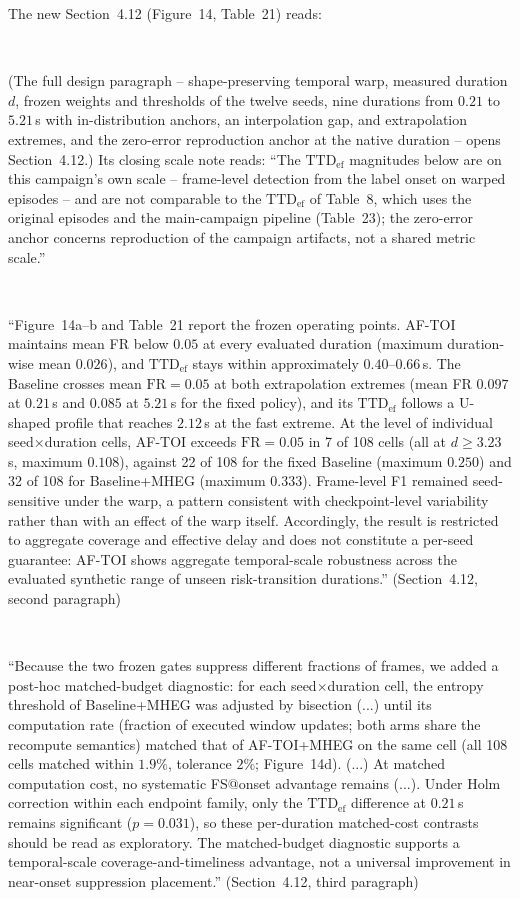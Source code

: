 \documentclass[1p,12pt,authoryear]{elsarticle}
\begin{document}
\vspace{2mm}
\noindent The new Section~4.12 (Figure~14, Table~21) reads:

~

(The full design paragraph -- shape-preserving temporal warp, measured duration $d$, frozen weights and thresholds of the twelve seeds, nine durations from $0.21$ to $5.21$\,s with in-distribution anchors, an interpolation gap, and extrapolation extremes, and the zero-error reproduction anchor at the native duration -- opens Section~4.12.) Its closing scale note reads: ``The $\mathrm{TTD}_{\mathrm{ef}}$ magnitudes below are on this campaign's own scale -- frame-level detection from the label onset on warped episodes -- and are not comparable to the $\mathrm{TTD}_{\mathrm{ef}}$ of Table~8, which uses the original episodes and the main-campaign pipeline (Table~23); the zero-error anchor concerns reproduction of the campaign artifacts, not a shared metric scale.''

~

``Figure~14a--b and Table~21 report the frozen operating points. AF-TOI maintains mean FR below $0.05$ at every evaluated duration (maximum duration-wise mean $0.026$), and $\mathrm{TTD}_{\mathrm{ef}}$ stays within approximately $0.40$--$0.66$\,s. The Baseline crosses mean $\mathrm{FR}=0.05$ at both extrapolation extremes (mean FR $0.097$ at $0.21$\,s and $0.085$ at $5.21$\,s for the fixed policy), and its $\mathrm{TTD}_{\mathrm{ef}}$ follows a U-shaped profile that reaches $2.12$\,s at the fast extreme. At the level of individual seed$\times$duration cells, AF-TOI exceeds $\mathrm{FR}=0.05$ in 7 of 108 cells (all at $d\ge3.23$\,s, maximum $0.108$), against 22 of 108 for the fixed Baseline (maximum $0.250$) and 32 of 108 for Baseline+MHEG (maximum $0.333$). Frame-level F1 remained seed-sensitive under the warp, a pattern consistent with checkpoint-level variability rather than with an effect of the warp itself. Accordingly, the result is restricted to aggregate coverage and effective delay and does not constitute a per-seed guarantee: AF-TOI shows aggregate temporal-scale robustness across the evaluated synthetic range of unseen risk-transition durations.'' (Section~4.12, second paragraph)

~

``Because the two frozen gates suppress different fractions of frames, we added a post-hoc matched-budget diagnostic: for each seed$\times$duration cell, the entropy threshold of Baseline+MHEG was adjusted by bisection (...) until its computation rate (fraction of executed window updates; both arms share the recompute semantics) matched that of AF-TOI+MHEG on the same cell (all 108 cells matched within $1.9\%$, tolerance $2\%$; Figure~14d). (...) At matched computation cost, no systematic FS@onset advantage remains (...). Under Holm correction within each endpoint family, only the $\mathrm{TTD}_{\mathrm{ef}}$ difference at $0.21$\,s remains significant ($p=0.031$), so these per-duration matched-cost contrasts should be read as exploratory. The matched-budget diagnostic supports a temporal-scale coverage-and-timeliness advantage, not a universal improvement in near-onset suppression placement.'' (Section~4.12, third paragraph)
\end{document}

